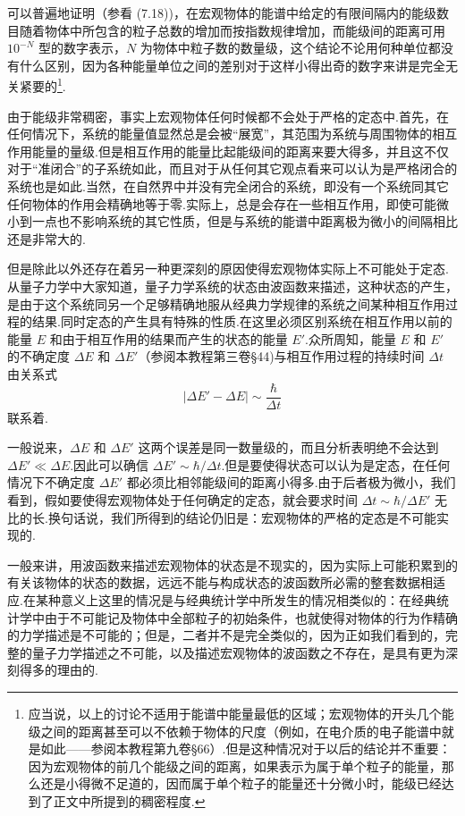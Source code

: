 可以普遍地证明（参看 (7.18))，在宏观物体的能谱中给定的有限间隔内的能级数目随着物体中所包含的粒子总数的增加而按指数规律增加，而能级间的距离可用 $10^{-N}$ 型的数字表示，$N$ 为物体中粒子数的数量级，这个结论不论用何种单位都没有什么区别，因为各种能量单位之间的差别对于这样小得出奇的数字来讲是完全无关紧要的\footnote{应当说，以上的讨论不适用于能谱中能量最低的区域；宏观物体的开头几个能级之间的距离甚至可以不依赖于物体的尺度（例如，在电介质的电子能谱中就是如此——参阅本教程第九卷§66）.但是这种情况对于以后的结论并不重要：因为宏观物体的前几个能级之间的距离，如果表示为属于单个粒子的能量，那么还是小得微不足道的，因而属于单个粒子的能量还十分微小时，能级已经达到了正文中所提到的稠密程度.}.

由于能级非常稠密，事实上宏观物体任何时候都不会处于严格的定态中.首先，在任何情况下，系统的能量值显然总是会被“展宽”，其范围为系统与周围物体的相互作用能量的量级.但是相互作用的能量比起能级间的距离来要大得多，并且这不仅对于“准闭合”的子系统如此，而且对于从任何其它观点看来可以认为是严格闭合的系统也是如此.当然，在自然界中并没有完全闭合的系统，即没有一个系统同其它任何物体的作用会精确地等于零.实际上，总是会存在一些相互作用，即使可能微小到一点也不影响系统的其它性质，但是与系统的能谱中距离极为微小的间隔相比还是非常大的.

但是除此以外还存在着另一种更深刻的原因使得宏观物体实际上不可能处于定态.从量子力学中大家知道，量子力学系统的状态由波函数来描述，这种状态的产生，是由于这个系统同另一个足够精确地服从经典力学规律的系统之间某种相互作用过程的结果.同时定态的产生具有特殊的性质.在这里必须区别系统在相互作用以前的能量 $E$ 和由于相互作用的结果而产生的状态的能量 $E'$.众所周知，能量 $E$ 和 $E'$ 的不确定度 $\Delta E$ 和 $\Delta E'$（参阅本教程第三卷§44)与相互作用过程的持续时间 $\Delta t$ 由关系式
\begin{equation*}
  \left|\Delta E'-\Delta E\right|\sim\frac{\hbar}{\Delta t}
\end{equation*}
联系着.

一般说来，$\Delta E$ 和 $\Delta E'$ 这两个误差是同一数量级的，而且分析表明绝不会达到 $\Delta E'\ll\Delta E$.因此可以确信 $\Delta E'\sim\hbar/\Delta t$.但是要使得状态可以认为是定态，在任何情况下不确定度 $\Delta E'$ 都必须比相邻能级间的距离小得多.由于后者极为微小，我们看到，假如要使得宏观物体处于任何确定的定态，就会要求时间 $\Delta t\sim\hbar/\Delta E'$ 无比的长.换句话说，我们所得到的结论仍旧是：宏观物体的严格的定态是不可能实现的.

一般来讲，用波函数来描述宏观物体的状态是不现实的，因为实际上可能积累到的有关该物体的状态的数据，远远不能与构成状态的波函数所必需的整套数据相适应.在某种意义上这里的情况是与经典统计学中所发生的情况相类似的：在经典统计学中由于不可能记及物体中全部粒子的初始条件，也就使得对物体的行为作精确的力学描述是不可能的；但是，二者并不是完全类似的，因为正如我们看到的，完整的量子力学描述之不可能，以及描述宏观物体的波函数之不存在，是具有更为深刻得多的理由的.


